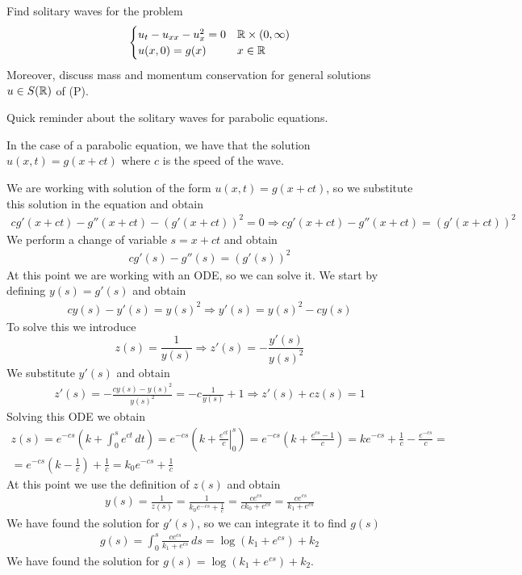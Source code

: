 \newpage
\begin{exercise}
    Find solitary waves for the problem
    \[
        \begin{cases}
            u_t - u_{xx} - u_x^2 = 0 & \mathbb{R} \times (0, \infty) \\
            u(x, 0) = g(x) & x \in \mathbb{R}
        \end{cases}
    \]
    Moreover, discuss mass and momentum conservation for general solutions \(u \in S(\mathbb{R})\) of (P).
\end{exercise}
Quick reminder about the solitary waves for parabolic equations. 
\begin{remark}
    In the case of a parabolic equation, we have that the solution \(u(x,t) =  g(x + ct)\) where \(c\) is the speed of the wave.
\end{remark}
We are working with solution of the form \(u(x,t) = g(x + ct)\), so we substitute this solution in the equation and obtain
\[
    \begin{split}
        cg'(x+ct) - g''(x+ct) - (g'(x+ct))^2 = 0 \Rightarrow cg'(x+ct) - g''(x+ct) = (g'(x+ct))^2
    \end{split}
\]
We perform a change of variable \(s = x + ct\) and obtain
\[
    \begin{split}
        cg'(s) - g''(s) = (g'(s))^2
    \end{split}
\]
At this point we are working with an ODE, so we can solve it. We start by defining \(y(s) = g'(s)\) and obtain
\[
    \begin{split}
        cy(s) - y'(s) = y(s)^2 \Rightarrow y'(s) = y(s)^2 - cy(s) 
    \end{split}
\]
To solve this we introduce 
\[
    z(s) = \frac{1}{y(s)} \Rightarrow z'(s) = - \frac{y'(s)}{y(s)^2} 
\]
We substitute \(y'(s)\) and obtain
\[
    \begin{split}
        z'(s) = - \frac{cy(s) - y(s)^2}{y(s)^2} = - c \frac{1}{y(s)} + 1 \Rightarrow z'(s) + c z(s) = 1
    \end{split}
\]
Solving this ODE we obtain
\[
    \begin{split}
        z(s) = e^{-cs} \left(k + \int_0^s e^{ct} \, dt\right) = e^{-cs} \left(k + \left. \frac{e^{ct}}{c} \right|_0^s\right) = e^{-cs} \left(k + \frac{e^{cs} - 1}{c}\right) = k e^{-cs} + \frac{1}{c} - \frac{e^{-cs}}{c} = \\
        = e^{-cs} \left(k - \frac{1}{c}\right) + \frac{1}{c} = k_0 e^{-cs} + \frac{1}{c}
    \end{split}
\]
At this point we use the definition of \(z(s)\) and obtain
\[
    \begin{split}
        y(s) = \frac{1}{z(s)} = \frac{1}{k_0 e^{-cs} + \frac{1}{c}} = \frac{c e^{cs}}{c k_0 + e^{cs}} = \frac{c e^{cs}}{k_1 + e^{cs}}
    \end{split}
\]
We have found the solution for \(g'(s)\), so we can integrate it to find \(g(s)\)
\[
    \begin{split}
        g(s) = \int_0^s \frac{c e^{cs}}{k_1 + e^{cs}} \, ds = \log(k_1 + e^{cs}) + k_2
    \end{split}
\]
We have found the solution for \(g(s) = \log(k_1 + e^{cs}) + k_2\).

